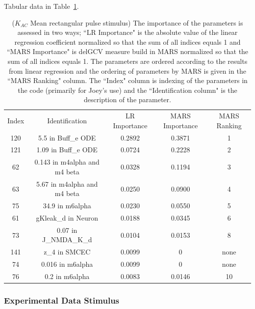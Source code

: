 \documentclass[12pt]{article}
\numberwithin{equation}{section}
\begin{document}
Tabular data in Table~\ref{qoi_K_AC_Mean_rec}.

\begin{table}[h]
\centering
\begin{tabular}{ccccc}
Index & Identification & LR Importance & MARS Importance & MARS Ranking \\
120 & 5.5 in Buff\_e ODE & 0.2892 &  0.3871 & 1\\
121 & 1.09 in Buff\_e ODE & 0.0724 & 0.2228 & 2\\
62 & 0.143 in m4alpha and m4 beta & 0.0328 &  0.1194 & 3\\
63 &   5.67 in m4alpha and m4 beta & 0.0250 & 0.0900 & 4\\
75 & 34.9 in m6alpha & 0.0230 & 0.0550 & 5\\
61 & gKleak\_d in Neuron & 0.0188 & 0.0345 & 6\\
73 & 0.07 in J\_NMDA\_K\_d & 0.0104 & 0.0153 & 8\\
141 & z\_4 in SMCEC & 0.0099 & 0 & none\\
74 & 0.016 in m6alpha & 0.0099 & 0 & none\\
76 & 0.2 in m6alpha & 0.0083 & 0.0146 & 10\\
\end{tabular}
\caption{($K_{AC}$ Mean rectangular pulse stimulus) The importance of the parameters is assessed in two ways; ``LR Importance" is the absolute value of the linear regression coefficient normalized so that the sum of all indices equals 1 and ``MARS Importance" is delGCV measure build in MARS normalized so that the sum of all indices equals 1. The parameters are ordered according to the results from linear regression and the ordering of parameters by MARS is given in the ``MARS Ranking" column. The ``Index" column is indexing of the parameters in the code (primarily for Joey's use) and the ``Identification column" is the description of the parameter.}
\label{qoi_K_AC_Mean_rec}
\end{table}

\newpage

\subsubsection{Experimental Data Stimulus}
\end{document}
